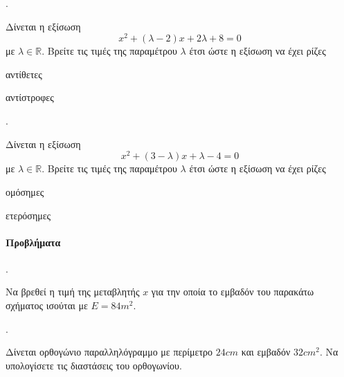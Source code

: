 \documentclass[11pt,a4paper,twocolumn]{article}
\newcounter{askhsh}
\newcommand{\askhsh}{{\large\theaskhsh.}\ \addtocounter{askhsh}{1}}
\begin{document}
\askhsh Δίνεται η εξίσωση
\[ x^2+(\lambda-2)x+2\lambda+8=0 \]
με $\lambda\in\mathbb{R}$. Βρείτε τις τιμές της παραμέτρου $\lambda$ έτσι ώστε η εξίσωση να έχει ρίζες
\begin{multicols}{2}
\begin{alist}
\item αντίθετες
\item αντίστροφες
\end{alist}
\end{multicols}
\askhsh Δίνεται η εξίσωση
\[ x^2+(3-\lambda)x+\lambda-4=0 \]
με $\lambda\in\mathbb{R}$. Βρείτε τις τιμές της παραμέτρου $\lambda$ έτσι ώστε η εξίσωση να έχει ρίζες
\begin{multicols}{2}
\begin{alist}
\item ομόσημες
\item ετερόσημες
\end{alist}
\end{multicols}
\paragraph{Προβλήματα}
\askhsh
Να βρεθεί η τιμή της μεταβλητής $ x $ για την οποία το εμβαδόν του παρακάτω σχήματος ισούται με $ E=84m^2 $.
\begin{center}
\end{center}
\askhsh Δίνεται ορθογώνιο παραλληλόγραμμο με περίμετρο $24\si{cm}$ και εμβαδόν $32\si{cm}^2$. Να υπολογίσετε τις διαστάσεις του ορθογωνίου.
\end{document}

